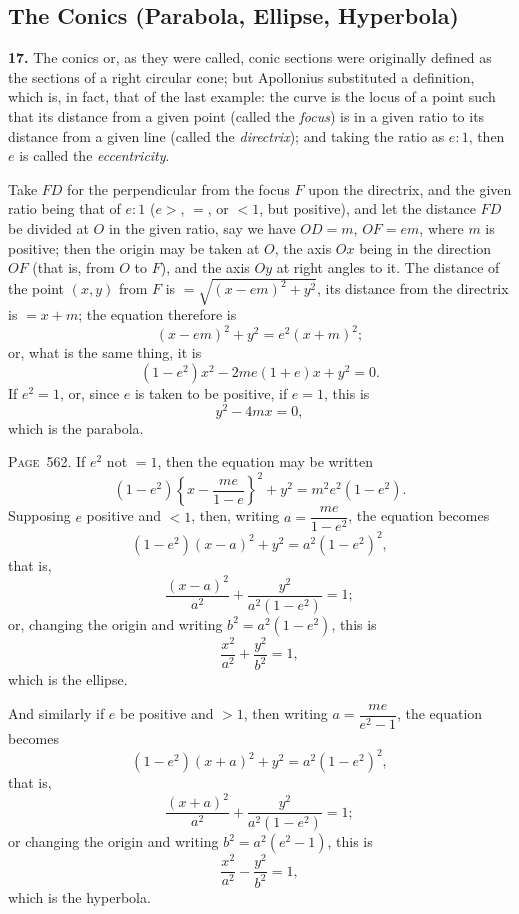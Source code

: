 \documentclass[11pt,a4paper]{article}
\theoremstyle{definition}
\begin{document}
\subsection*{The Conics (Parabola, Ellipse, Hyperbola)}

\textbf{17.} The conics or, as they were called, conic sections were originally defined as the sections of a right circular cone; but Apollonius substituted a definition, which is, in fact, that of the last example: the curve is the locus of a point such that its distance from a given point (called the \textit{focus}) is in a given ratio to its distance from a given line (called the \textit{directrix}); and taking the ratio as $e:1$, then $e$ is called the \textit{eccentricity}.

Take $FD$ for the perpendicular from the focus $F$ upon the directrix, and the given ratio being that of $e:1$ ($e>$, $=$, or $<1$, but positive), and let the distance $FD$ be divided at $O$ in the given ratio, say we have $OD=m$, $OF=em$, where $m$ is positive; then the origin may be taken at $O$, the axis $Ox$ being in the direction $OF$ (that is, from $O$ to $F$), and the axis $Oy$ at right angles to it. The distance of the point $(x,y)$ from $F$ is $=\sqrt{(x-em)^2+y^2}$, its distance from the directrix is $=x+m$; the equation therefore is
\[
(x-em)^2+y^2=e^2(x+m)^2;
\]
or, what is the same thing, it is
\[
(1-e^2)x^2-2me(1+e)x+y^2=0.
\]
If $e^2=1$, or, since $e$ is taken to be positive, if $e=1$, this is
\[
y^2-4mx=0,
\]
which is the parabola.

\newpage
\noindent\textsc{Page~562.} If $e^2$ not $=1$, then the equation may be written
\[
(1-e^2)\left\{x-\frac{me}{1-e}\right\}^2+y^2=m^2e^2(1-e^2).
\]
Supposing $e$ positive and $<1$, then, writing $a=\dfrac{me}{1-e^2}$, the equation becomes
\[
(1-e^2)(x-a)^2+y^2=a^2(1-e^2)^2,
\]
that is,
\[
\frac{(x-a)^2}{a^2}+\frac{y^2}{a^2(1-e^2)}=1;
\]
or, changing the origin and writing $b^2=a^2(1-e^2)$, this is
\[
\frac{x^2}{a^2}+\frac{y^2}{b^2}=1,
\]
which is the ellipse.

And similarly if $e$ be positive and $>1$, then writing $a=\dfrac{me}{e^2-1}$, the equation becomes
\[
(1-e^2)(x+a)^2+y^2=a^2(1-e^2)^2,
\]
that is,
\[
\frac{(x+a)^2}{a^2}+\frac{y^2}{a^2(1-e^2)}=1;
\]
or changing the origin and writing $b^2=a^2(e^2-1)$, this is
\[
\frac{x^2}{a^2}-\frac{y^2}{b^2}=1,
\]
which is the hyperbola.
\end{document}
